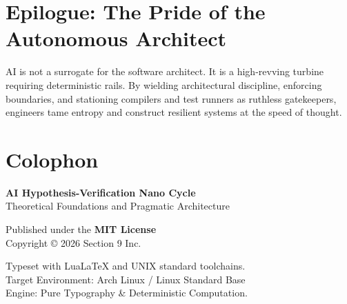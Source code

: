 \documentclass[11pt,a4paper,openany]{book}
\newif\ifja
\begin{document}
\ifja
  \chapter{結語：自律的アーキテクトの矜持}
  AIは開発者の代行者ではない。それは、厳密に設計されたレールの上を疾走するタービンである。
  手綱（アーキテクチャ規律）を握り、境界を敷き、コンパイラとテストハーネスを監視員として配備すること。これこそが、情報エントロピーの荒波に呑まれることなく、堅牢で純度の高いシステムを光速で組み上げる唯一無二の道である。
\else
  \chapter{Epilogue: The Pride of the Autonomous Architect}
  AI is not a surrogate for the software architect. It is a high-revving turbine requiring deterministic rails.
  By wielding architectural discipline, enforcing boundaries, and stationing compilers and test runners as ruthless gatekeepers, engineers tame entropy and construct resilient systems at the speed of thought.
\fi

\backmatter

\ifja
  \chapter*{奥付}
\else
  \chapter*{Colophon}
\fi

\begin{center}
\textbf{AI Hypothesis-Verification Nano Cycle\texttrademark} \\
\ifja 理論的基盤と実践アーキテクチャ \else Theoretical Foundations and Pragmatic Architecture \fi

\vspace{1cm}
Published under the \textbf{MIT License} \\
Copyright \copyright{} 2026 Section 9 Inc.

\vspace{1.5cm}
Typeset with Lua\LaTeX{} and UNIX standard toolchains. \\
Target Environment: Arch Linux / Linux Standard Base \\
Engine: Pure Typography \& Deterministic Computation.
\end{center}
\end{document}
